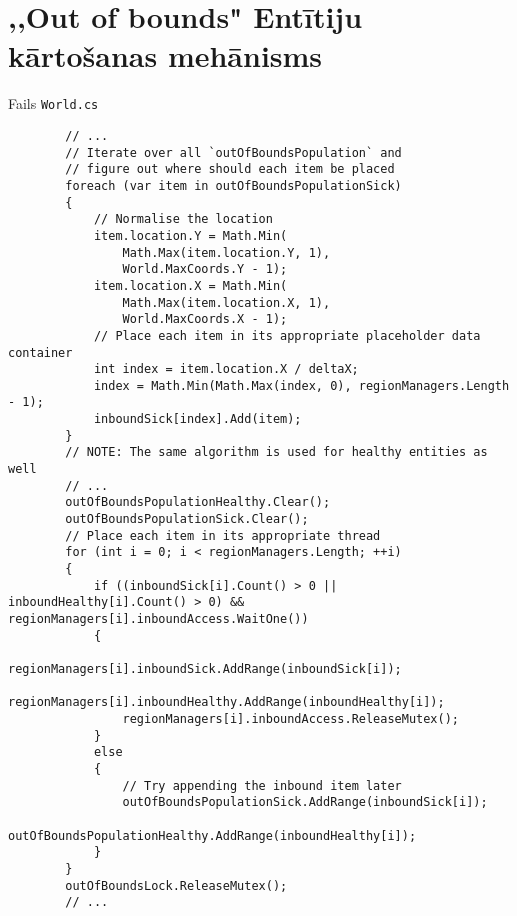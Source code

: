 \section{,,Out of bounds" Entītiju kārtošanas mehānisms }
\label{app:out-of-bounds-sorting}
Fails \texttt{World.cs}
{
    \begin{verbatim}
        // ...
        // Iterate over all `outOfBoundsPopulation` and
        // figure out where should each item be placed
        foreach (var item in outOfBoundsPopulationSick)
        {
            // Normalise the location
            item.location.Y = Math.Min(
                Math.Max(item.location.Y, 1),
                World.MaxCoords.Y - 1);
            item.location.X = Math.Min(
                Math.Max(item.location.X, 1),
                World.MaxCoords.X - 1);
            // Place each item in its appropriate placeholder data container
            int index = item.location.X / deltaX;
            index = Math.Min(Math.Max(index, 0), regionManagers.Length - 1);
            inboundSick[index].Add(item);
        }
        // NOTE: The same algorithm is used for healthy entities as well
        // ...
        outOfBoundsPopulationHealthy.Clear();
        outOfBoundsPopulationSick.Clear();
        // Place each item in its appropriate thread
        for (int i = 0; i < regionManagers.Length; ++i)
        {
            if ((inboundSick[i].Count() > 0 || inboundHealthy[i].Count() > 0) && regionManagers[i].inboundAccess.WaitOne())
            {
                regionManagers[i].inboundSick.AddRange(inboundSick[i]);
                regionManagers[i].inboundHealthy.AddRange(inboundHealthy[i]);
                regionManagers[i].inboundAccess.ReleaseMutex();
            }
            else
            {
                // Try appending the inbound item later
                outOfBoundsPopulationSick.AddRange(inboundSick[i]);
                outOfBoundsPopulationHealthy.AddRange(inboundHealthy[i]);
            }
        }
        outOfBoundsLock.ReleaseMutex();
        // ...
    \end{verbatim}
}



